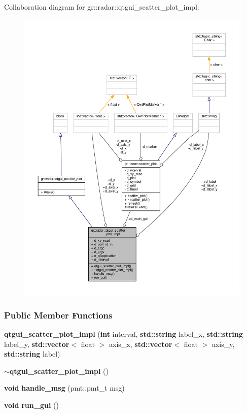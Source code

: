 Collaboration diagram for gr\+:\+:radar\+:\+:qtgui\+\_\+scatter\+\_\+plot\+\_\+impl\+:
\nopagebreak
\begin{figure}[H]
\begin{center}
\leavevmode
\includegraphics[width=350pt]{d4/d1a/classgr_1_1radar_1_1qtgui__scatter__plot__impl__coll__graph}
\end{center}
\end{figure}
\subsubsection*{Public Member Functions}
\begin{DoxyCompactItemize}
\item 
{\bf qtgui\+\_\+scatter\+\_\+plot\+\_\+impl} ({\bf int} interval, {\bf std\+::string} label\+\_\+x, {\bf std\+::string} label\+\_\+y, {\bf std\+::vector}$<$ float $>$ axis\+\_\+x, {\bf std\+::vector}$<$ float $>$ axis\+\_\+y, {\bf std\+::string} label)
\item 
{\bf $\sim$qtgui\+\_\+scatter\+\_\+plot\+\_\+impl} ()
\item 
{\bf void} {\bf handle\+\_\+msg} (pmt\+::pmt\+\_\+t msg)
\item 
{\bf void} {\bf run\+\_\+gui} ()
\end{DoxyCompactItemize}
